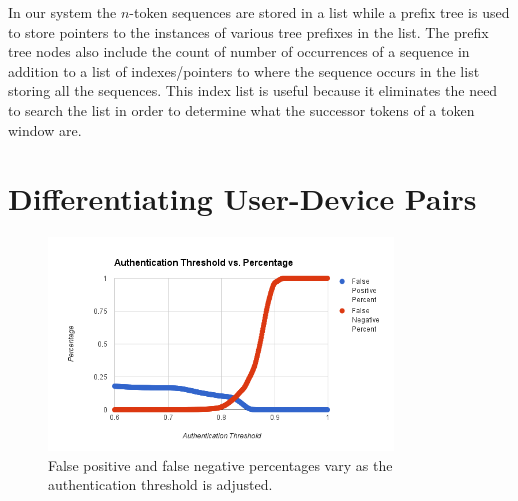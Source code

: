 \documentclass{acm_proc_article-sp}
\begin{document}

In our system the $n$-token sequences are stored in a list while a prefix tree is used to store pointers to the instances of various tree prefixes in the list. 
The prefix tree nodes also include the count of number of occurrences of a sequence in addition
to a list of indexes/pointers to where the sequence occurs in the list storing all the sequences.
This index list is useful because it eliminates the need to search the list in order to determine what the successor tokens of a token window are.


\section{Differentiating User-Device Pairs}
\label{sec:differentiation}


\begin{figure}
\centering
\includegraphics[width=3.6in]{threshold_vs_percentages.png}
\caption{False positive and false negative percentages vary as the authentication threshold is adjusted.}
\label{fig:threshold_vs_percentages}
\end{figure}
\end{document}
